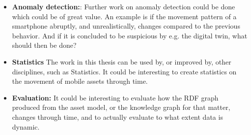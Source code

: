 \documentclass{article}
\begin{document}
\begin{itemize}
    \item \textbf{Anomaly detection:}: Further work on anomaly detection could be done which could be of great value. An example is if the movement pattern of a smartphone abruptly, and unrealistically, changes compared to the previous behavior. And if it is concluded to be suspicious by e.g. the digital twin, what should then be done?
    \item \textbf{Statistics} The work in this thesis can be used by, or improved by, other disciplines, such as Statistics. It could be interesting to create statistics on the movement of mobile assets through time.
    \item \textbf{Evaluation:} It could be interesting to evaluate how the RDF graph produced from the asset model, or the knowledge graph for that matter, changes through time, and to actually evaluate to what extent data is dynamic.
\end{itemize}

\newpage
\printbibliography
\end{document}
